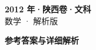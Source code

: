 \documentclass[zihao=-4, a4paper]{ctexart}
\begin{document}
\begin{center}
  {\Large\bfseries 2012 年·陕西卷·文科}\\[4pt]
  {\large 数学 · 解析版}
\end{center}
\medskip
{}

\clearpage
{}
\begin{center}{\Large\bfseries 参考答案与详细解析}\end{center}
\medskip

\end{document}

